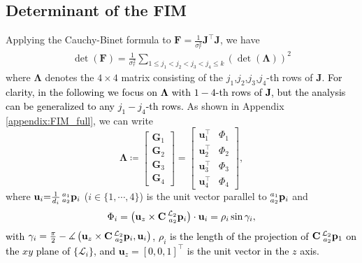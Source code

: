 \documentclass[journal]{IEEEtran}
\def\AlignedPosTarg{\mathbf{C} \prescript{\mathcal{L}_2}{a_2}{\mathbf{p}}} %
\def\FIM{\mathbf{F}}
\def\detF{\det(\FIM)}
\def\detL{\det(\mathbf{\Lambda})}
\def\RelPosUWBAnts{\prescript{a_1}{a_2}{\mathbf{p}}}
\def\UnitZ{\mathbf{u}_z}
\begin{document}
\subsection{Determinant of the FIM} \label{subsec:det_FIM}
Applying the Cauchy-Binet formula to $\FIM {=} \frac{1}{\sigma_r^{2}} \mathbf{J}^\top \mathbf{J}$, we have
\begin{equation}\label{eq:det_FIM_4dof}
\begin{aligned}
    \detF
    = \frac{1}{\sigma_r^2} \sum\limits_{1 \leq j_1 < j_2 < j_3 < j_4 \leq k}^{} (\detL)^2
\end{aligned}
\end{equation}
where $\mathbf{\Lambda}$ denotes the $4\times4$ matrix consisting of the $j_1$,$j_2$,$j_3$,$j_4$-th rows of $\mathbf{J}$.
\textcolor{black}{For clarity, in the following we focus on $\mathbf{\Lambda}$ with $1{-}4$-th rows of $\mathbf{J}$, but the analysis can be generalized to any $j_1{-}j_4$-th rows.}
As shown in Appendix \ref{appendix:FIM_full}, we can write
\begin{equation} \label{eq:Lambda_def}
    \mathbf{\Lambda} \coloneqq 
    \begin{bmatrix}
        \mathbf{G}_1 \\[0.2em]
        \mathbf{G}_2 \\[0.2em]
        \mathbf{G}_3 \\[0.2em]
        \mathbf{G}_4
    \end{bmatrix} =
    \begin{bmatrix}
        \mathbf{u}_1^\top & \Phi_1 \\[0.2em]
        \mathbf{u}_2^\top & \Phi_2 \\[0.2em]
        \mathbf{u}_3^\top & \Phi_3 \\[0.2em]
        \mathbf{u}_4^\top & \Phi_4
    \end{bmatrix},
\end{equation}
where $\mathbf{u}_i {=} \frac{1}{d_i} \RelPosUWBAnts_i$ ($i \in \{1,\cdots,4\}$) is the unit vector parallel to $\RelPosUWBAnts_i$ and
\textcolor{black}{
\begin{equation} \label{eq:detF_phi_i}
    \Phi_i =
        \left( \UnitZ \times \AlignedPosTarg_i \right) 
        \cdot \mathbf{u}_i = \rho_i \sin \gamma_i,
\end{equation}
with
$\gamma_i = \frac{\pi}{2} - \measuredangle \left(\UnitZ \times \AlignedPosTarg_i, \mathbf{u}_i\right)$,
$\rho_i$ is the length of the projection of $\AlignedPosTarg_1$ on the $xy$ plane of $\{\mathcal{L}_i\}$, and
$\UnitZ = [0, 0, 1]^\top$ is the unit vector in the $z$ axis.
}
\end{document}
